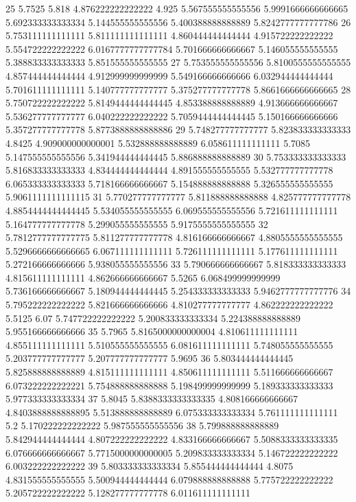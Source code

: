 25 5.7525 5.818 4.876222222222222 4.925 5.567555555555556 5.9991666666666665 5.692333333333334 5.144555555555556 5.400388888888889 5.8242777777777786
26 5.753111111111111 5.811111111111111 4.860444444444444 4.915722222222222 5.554722222222222 6.0167777777777784 5.701666666666667 5.146055555555555 5.388833333333333 5.851555555555555
27 5.753555555555556 5.8100555555555555 4.857444444444444 4.912999999999999 5.549166666666666 6.032944444444444 5.701611111111111 5.140777777777777 5.375277777777778 5.8661666666666665
28 5.750722222222222 5.8149444444444445 4.853388888888889 4.913666666666667 5.536277777777777 6.040222222222222 5.7059444444444445 5.150166666666666 5.357277777777778 5.8773888888888886
29 5.748277777777777 5.823833333333333 4.8425 4.909000000000001 5.532888888888889 6.058611111111111 5.7085 5.147555555555556 5.341944444444445 5.886888888888889
30 5.753333333333333 5.816833333333333 4.834444444444444 4.891555555555555 5.532777777777778 6.065333333333333 5.718166666666667 5.154888888888888 5.326555555555555 5.9061111111111115
31 5.770277777777777 5.811888888888888 4.825777777777778 4.8854444444444445 5.534055555555555 6.069555555555556 5.721611111111111 5.164777777777778 5.299055555555555 5.9175555555555555
32 5.7812777777777775 5.811277777777778 4.816166666666667 4.8805555555555555 5.5296666666666665 6.067111111111111 5.726111111111111 5.177611111111111 5.272166666666666 5.938055555555556
33 5.790666666666667 5.818333333333333 4.815611111111111 4.862666666666667 5.5265 6.068499999999999 5.736166666666667 5.180944444444445 5.254333333333333 5.9462777777777776
34 5.795222222222222 5.821666666666666 4.810277777777777 4.862222222222222 5.5125 6.07 5.747722222222222 5.200833333333334 5.224388888888889 5.955166666666666
35 5.7965 5.8165000000000004 4.810611111111111 4.855111111111111 5.510555555555555 6.081611111111111 5.748055555555555 5.203777777777777 5.207777777777777 5.9695
36 5.803444444444445 5.825888888888889 4.815111111111111 4.850611111111111 5.511666666666667 6.073222222222221 5.754888888888888 5.198499999999999 5.189333333333333 5.977333333333334
37 5.8045 5.8388333333333335 4.808166666666667 4.8403888888888895 5.513888888888889 6.075333333333334 5.761111111111111 5.2 5.170222222222222 5.987555555555556
38 5.799888888888889 5.842944444444444 4.807222222222222 4.833166666666667 5.5088333333333335 6.076666666666667 5.7715000000000005 5.209833333333334 5.146722222222222 6.003222222222222
39 5.803333333333334 5.855444444444444 4.8075 4.831555555555555 5.500944444444444 6.079888888888888 5.775722222222222 5.205722222222222 5.128277777777778 6.011611111111111
